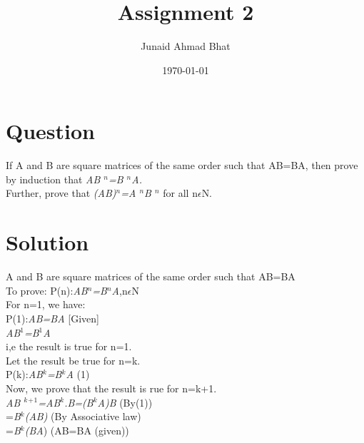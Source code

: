 \documentclass[a4paper,12pt]{article}
\begin{document}
\title{Assignment 2}
\author{Junaid Ahmad Bhat}
\date{\today}
\maketitle
\section*{\small Question}
If A and B are square matrices of the same order such that AB=BA, then prove by induction that \textit{AB $^n$=B $^n$A.} \\ 
Further, prove that \textit{(AB)$^n$=A $^n$B $^n$} for all n$\epsilon$N.\\

\section*{\small Solution}

A and B are square matrices of the same order such that AB=BA\\

To prove: P(n):\textit{AB$^n$=B$^n$A},n$\epsilon$N\\

For n=1, we have:\\

P(1):\textit{AB=BA} [Given]\\

\textit{AB$^1$=B$^1$A}\\

i,e the result is true for n=1.\\

Let the result be true for n=k.\\

P(k):\textit{AB$^k$=B$^k$A}   \hspace{4cm}(1)\\

Now, we prove that the result is rue for n=k+1.\\

\textit{AB $^k$$^+$$^1$=AB$^k$.B=(B$^k$A)B} (By(1))\\

            \hspace{4cm}   =\textit{B$^k$(AB)} \hspace{2cm}(By Associative law)\\

              \hspace{4cm} =\textit{B$^k$(BA}) \hspace{2cm}(AB=BA (given))\\
\end{document}
